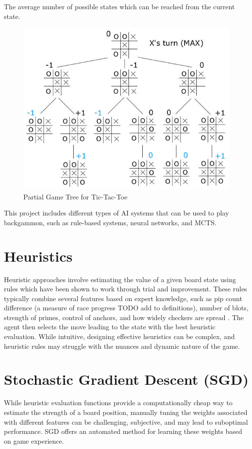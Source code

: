 \begin{definition}
    The average number of possible states which can be reached from the current state.    
\end{definition}

\begin{figure}[H]
    \centering
    \includegraphics[width=0.7\linewidth]{images/gametree.png}
    \caption{Partial Game Tree for Tic-Tac-Toe \cite{tictactoe}}
    \label{fig:gametree}
\end{figure}



This project includes different types of AI systems that can be used to play backgammon, such as rule-based systems, neural networks, and MCTS.

\section{Heuristics}
Heuristic approaches involve estimating the value of a given board state using rules which have been shown to work through trial and improvement. These rules typically combine several features based on expert knowledge, such as pip count difference (a measure of race progress TODO add to definitions), number of blots, strength of primes, control of anchors, and how widely checkers are spread \cite{heuristic}. The agent then selects the move leading to the state with the best heuristic evaluation. While intuitive, designing effective heuristics can be complex, and heuristic rules may struggle with the nuances and dynamic nature of the game.


\section{Stochastic Gradient Descent (SGD)}
While heuristic evaluation functions provide a computationally cheap way to estimate the strength of a board position, manually tuning the weights associated with different features can be challenging, subjective, and may lead to suboptimal performance. SGD offers an automated method for learning these weights based on game experience.

